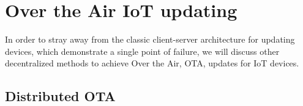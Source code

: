 

\section{Over the Air IoT updating} %
\label{sec:Over the Air  IoT updating}
In order to stray away from the classic client-server architecture for updating devices, which demonstrate a single
point of failure, we will discuss other decentralized methods to achieve Over the Air, OTA, updates for IoT devices.

\subsection{Distributed OTA} %
\label{sub:Distributed OTA}

